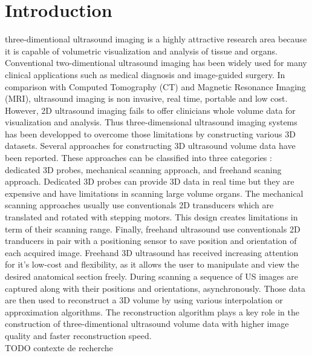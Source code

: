 \documentclass[12pt,journal,compsoc]{IEEEtran}
\begin{document}
\section{Introduction}

 three-dimentional ultrasound imaging is a highly attractive research area because it is capable of volumetric visualization and analysis of tissue and organs. Conventional two-dimentional ultrasound imaging has been widely used for many clinical applications such as medical diagnosis and image-guided surgery. In comparison with Computed Tomography (CT) and Magnetic Resonance Imaging (MRI), ultrasound imaging is non invasive, real time, portable and low cost. However, 2D ultrasound imaging fails to offer clinicians whole volume data for visualization and analysis. Thus three-dimensional ultrasound imaging systems has been developped to overcome those limitations by constructing various 3D datasets. Several approaches for constructing 3D ultrasound volume data have been reported. These approaches can be classified into three categories : dedicated 3D probes, mechanical scanning approach, and freehand scaning approach. 
Dedicated 3D probes can provide 3D data in real time but they are expensive and have limitations in scanning large volume organs.
The mechanical scanning approaches usually use conventionals 2D transducers which are translated and rotated with stepping motors. This design creates limitations in term of their scanning range. 
Finally, freehand ultrasound use conventionals 2D tranducers in pair with a positioning sensor to save position and orientation of each acquired image.
Freehand 3D ultrasound has received increasing attention for it's low-cost and flexibility, as it allows the user to manipulate and view the desired anatomical section freely.
During scanning a sequence of US images are captured along with their positions and orientations, asynchronously. Those data are then used to reconstruct a 3D volume by using various interpolation or approximation algorithms. The reconstruction algorithm plays a key role in the construction of three-dimentional ultrasound volume data with higher image quality and faster reconstruction speed.\\

TODO contexte de recherche\\
\end{document}
